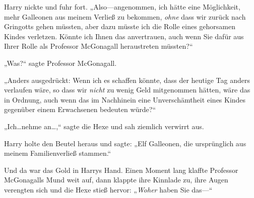 Harry nickte und fuhr fort. „Also—angenommen, ich hätte eine Möglichkeit, mehr Galleonen aus meinem Verließ zu bekommen, \emph{ohne} dass wir zurück nach Gringotts gehen müssten, aber dazu müsste ich die Rolle eines gehorsamen Kindes verletzen. Könnte ich Ihnen das anvertrauen, auch wenn Sie dafür aus Ihrer Rolle als Professor McGonagall heraustreten müssten?“

„Was?“ sagte Professor McGonagall.

„Anders ausgedrückt: Wenn ich es schaffen könnte, dass der heutige Tag anders verlaufen wäre, so dass wir \emph{nicht} zu wenig Geld mitgenommen hätten, wäre das in Ordnung, auch wenn das im Nachhinein eine Unverschämtheit eines Kindes gegenüber einem Erwachsenen bedeuten würde?“

„Ich…nehme an…,“ sagte die Hexe und sah ziemlich verwirrt aus.

Harry holte den Beutel heraus und sagte: „Elf Galleonen, die ursprünglich aus meinem Familienverließ stammen.“

Und da war das Gold in Harrys Hand. Einen Moment lang klaffte Professor McGonagalls Mund weit auf, dann klappte ihre Kinnlade zu, ihre Augen verengten sich und die Hexe stieß hervor: „\emph{Woher} haben Sie das—“


